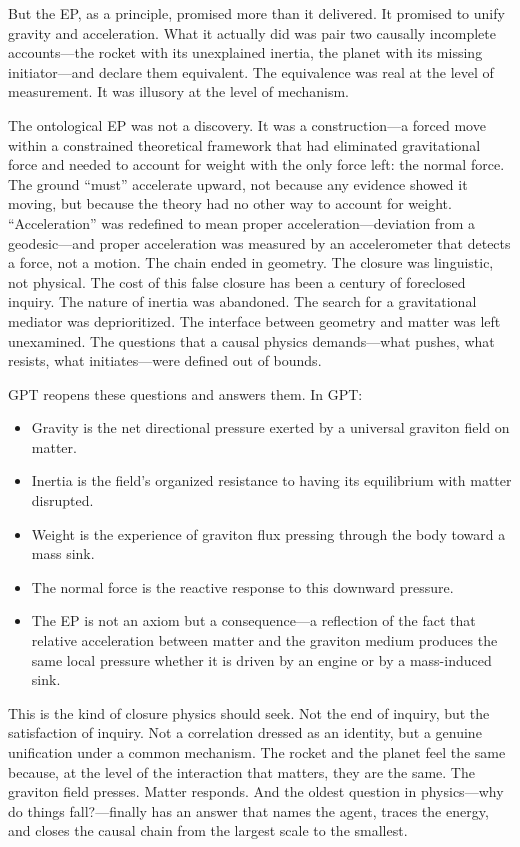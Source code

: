 \documentclass[11pt]{article}
\begin{document}
But the EP, as a principle, promised more than it delivered. It promised to unify gravity and acceleration. What it actually did was pair two causally incomplete accounts---the rocket with its unexplained inertia, the planet with its missing initiator---and declare them equivalent. The equivalence was real at the level of measurement. It was illusory at the level of mechanism.

The ontological EP was not a discovery. It was a construction---a forced move within a constrained theoretical framework that had eliminated gravitational force and needed to account for weight with the only force left: the normal force. The ground ``must'' accelerate upward, not because any evidence showed it moving, but because the theory had no other way to account for weight. ``Acceleration'' was redefined to mean proper acceleration---deviation from a geodesic---and proper acceleration was measured by an accelerometer that detects a force, not a motion. The chain ended in geometry. The closure was linguistic, not physical. The cost of this false closure has been a century of foreclosed inquiry. The nature of inertia was abandoned. The search for a gravitational mediator was deprioritized. The interface between geometry and matter was left unexamined. The questions that a causal physics demands---what pushes, what resists, what initiates---were defined out of bounds.

GPT reopens these questions and answers them. In GPT:

\begin{itemize}
\item
  Gravity is the net directional pressure exerted by a universal graviton field on matter.
\item
  Inertia is the field's organized resistance to having its equilibrium with matter disrupted.
\item
  Weight is the experience of graviton flux pressing through the body toward a mass sink.
\item
  The normal force is the reactive response to this downward pressure.
\item
  The EP is not an axiom but a consequence---a reflection of the fact that relative acceleration between matter and the graviton medium produces the same local pressure whether it is driven by an engine or by a mass-induced sink.
\end{itemize}

This is the kind of closure physics should seek. Not the end of inquiry, but the satisfaction of inquiry. Not a correlation dressed as an identity, but a genuine unification under a common mechanism. The rocket and the planet feel the same because, at the level of the interaction that matters, they are the same. The graviton field presses. Matter responds. And the oldest question in physics---why do things fall?---finally has an answer that names the agent, traces the energy, and closes the causal chain from the largest scale to the smallest.
\end{document}
